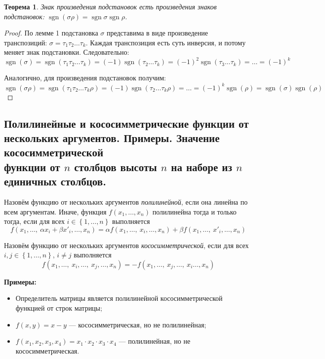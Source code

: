 \documentclass[a4paper, 12pt]{article}
\DeclareMathOperator{\sgn}{sgn}
\newtheorem*{que22theorem}{Теорема}
\begin{document}
\begin{que22theorem}
Знак произведения подстановок есть произведения знаков подстановок: $\sgn (\sigma\rho) = \sgn \sigma \sgn \rho$.
\end{que22theorem}

\begin{proof}
По лемме 1 подстановка $\sigma$ представима в виде произведение транспозиций: $\sigma = \tau_1\tau_2\dots\tau_k$. Каждая транспозиция есть суть инверсия, и потому меняет знак подстановки. Следовательно:
$$
\sgn(\sigma) = \sgn(\tau_1\tau_2\dots\tau_k) = (-1)\sgn(\tau_2\dots\tau_k) = (-1)^2\sgn(\tau_3\dots\tau_k) = \dots = (-1)^k
$$

Аналогично, для произведения подстановок получим:
$$
\sgn(\sigma\rho) = \sgn(\tau_1\tau_2\dots\tau_k\rho) = (-1)\sgn(\tau_2\dots\tau_k\rho) = \dots = (-1)^k \sgn(\rho) = \sgn(\sigma)\sgn(\rho)
$$
\end{proof}

\subsection{Полилинейные и кососимметрические функции от нескольких аргументов. Примеры. Значение кососимметрической\\ функции от $n$ столбцов высоты $n$ на наборе из $n$ единичных столбцов.}
Назовём функцию от нескольких аргументов \emph{полилинейной}, если она линейна по всем аргументам. Иначе, функция $f(x_1, \ldots, x_n)$ полилинейна тогда и только тогда, если для всех $i \in \left\{ 1, \ldots, n \right\}$ выполняется
\[
     f(x_1,\ldots,\ \alpha x_i + \beta x'_i, \ldots , x_n) = \alpha f(x_1,\ldots,\ x_i, \ldots , x_n) + \beta f(x_1,\ldots,\ x'_i, \ldots , x_n)
\]

Назовём функцию от нескольких аргументов \emph{кососимметрической}, если для всех \\$i, j \in \left\{ 1, \ldots, n \right\}$, $i \neq j$ выполняется
\[
     f(x_1,\ldots,\ x_i ,\ldots,\ x_j, \ldots , x_n) = -f(x_1,\ldots,\ x_j,\ldots,\ x_i \ldots , x_n)
\]

\textbf{Примеры:}
\begin{itemize}
\item Определитель матрицы является полилинейной кососимметрической функцией от строк матрицы;
\item $f(x, y) = x-y$ --- кососимметрическая, но не полилинейная;
\item $f(x_1, x_2, x_3, x_4) = x_1\cdot x_2\cdot x_3\cdot x_4$ --- полилинейная, но не кососимметрическая.
\end{itemize}
\end{document}
